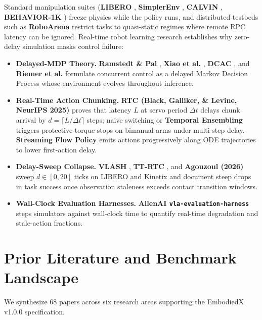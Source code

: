 \documentclass[10pt,letterpaper]{article}
\begin{document}
Standard manipulation suites (\textbf{LIBERO} \cite{Liu2023libero}, \textbf{SimplerEnv} \cite{Li2024evaluating}, \textbf{CALVIN} \cite{Mees2022calvin}, \textbf{BEHAVIOR-1K} \cite{Stanford2026behavior}) freeze physics while the policy runs, and distributed testbeds such as \textbf{RoboArena} \cite{Atreya2025roboarena} restrict tasks to quasi-static regimes where remote RPC latency can be ignored. Real-time robot learning research establishes why zero-delay simulation masks control failure:
\begin{itemize}
    \item \textbf{Delayed-MDP Theory.} \textbf{Ramstedt \& Pal} \cite{Ramstedt2019realtime}, \textbf{Xiao et al.} \cite{Xiao2020thinking}, \textbf{DCAC} \cite{Ramstedt2020reinforcement}, and \textbf{Riemer et al.} \cite{Riemer2024enabling} formulate concurrent control as a delayed Markov Decision Process whose environment evolves throughout inference.
    \item \textbf{Real-Time Action Chunking.} \textbf{RTC (Black, Galliker, \& Levine, NeurIPS 2025)} \cite{Black2025realtime} proves that latency $L$ at servo period $\Delta t$ delays chunk arrival by $d = \lceil L / \Delta t \rceil$ steps; naive switching or \textbf{Temporal Ensembling} \cite{Zhao2023learning} triggers protective torque stops on bimanual arms under multi-step delay. \textbf{Streaming Flow Policy} \cite{Jiang2025streaming} emits actions progressively along ODE trajectories to lower first-action delay.
    \item \textbf{Delay-Sweep Collapse.} \textbf{VLASH} \cite{Tang2025vlash}, \textbf{TT-RTC} \cite{Black2025trainingtime}, and \textbf{Agouzoul (2026)} \cite{Agouzoul2026understanding} sweep $d \in [0, 20]$ ticks on LIBERO and Kinetix and document steep drops in task success once observation staleness exceeds contact transition windows.
    \item \textbf{Wall-Clock Evaluation Harnesses.} \textbf{AllenAI \texttt{vla-evaluation-harness}} \cite{AllenAI2026vlaeval} steps simulators against wall-clock time to quantify real-time degradation and stale-action fractions.
\end{itemize}

\section{Prior Literature and Benchmark Landscape}

We synthesize 68 papers across six research areas supporting the EmbodiedX v1.0.0 specification.
\end{document}
